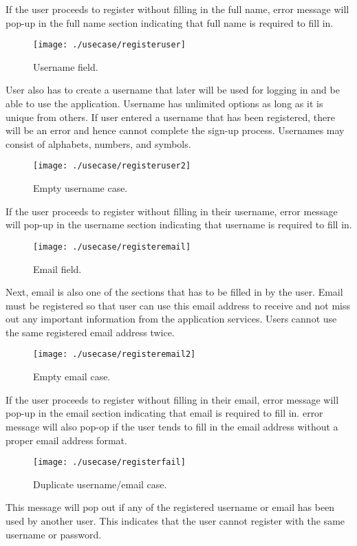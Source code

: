 \documentclass[conference]{IEEEtran}
\begin{document}
\par If the user proceeds to register without filling in the full name, error message will pop-up in the full name section indicating that full name is required to fill in.
\begin{figure}[h!]
\texttt{[image: ./usecase/registeruser]}
\centering
\caption{Username field.}
\end{figure}
\par User also has to create a username that later will be used for logging in and be able to use the application. Username has unlimited options as long as it is unique from others. If user entered a username that has been registered, there will be an error and hence cannot complete the sign-up process. Usernames may consist of alphabets, numbers, and symbols. 
\begin{figure}[h!]
\texttt{[image: ./usecase/registeruser2]}
\centering
\caption{Empty username case.}
\end{figure}
\par If the user proceeds to register without filling in their username, error message will pop-up in the username section indicating that username is required to fill in. 
\begin{figure}[h!]
\texttt{[image: ./usecase/registeremail]}
\centering
\caption{Email field.}
\end{figure}
\par Next, email is also one of the sections that has to be filled in by the user. Email must be registered so that user can use this email address to receive and not miss out any important information from the application services. Users cannot use the same registered email address twice. 
\begin{figure}[h!]
\texttt{[image: ./usecase/registeremail2]}
\centering
\caption{Empty email case.}
\end{figure}
\par If the user proceeds to register without filling in their email, error message will pop-up in the email section indicating that email is required to fill in. error message will also pop-op if the user tends to fill in the email address without a proper email address format. 
\begin{figure}[h!]
\texttt{[image: ./usecase/registerfail]}
\centering
\caption{Duplicate username/email case.}
\end{figure}
\par This message will pop out if any of the registered username or email has been used by another user. This indicates that the user cannot register with the same username or password. 
\end{document}
